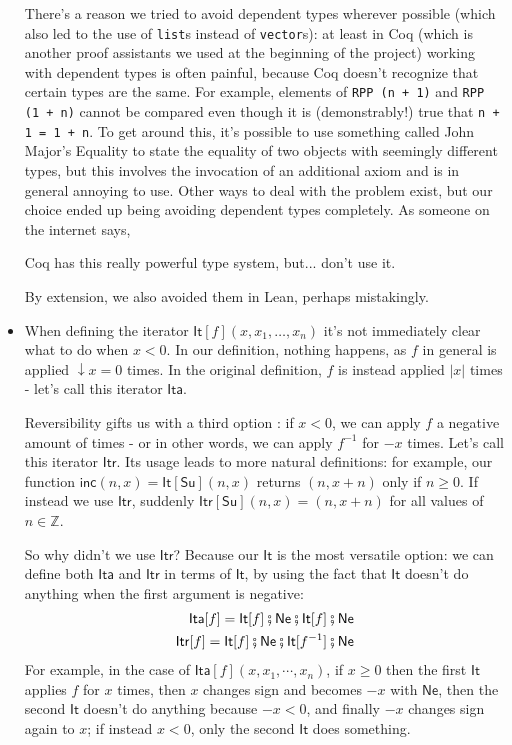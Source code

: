 \documentclass{book}
\theoremstyle{definition}
\theoremstyle{remark}
\theoremstyle{plain}
\newcommand{\ZZ}{\mathbb{Z}}
\newcommand{\rppNe}{\mathsf{Ne}}
\newcommand{\rppSu}{\mathsf{Su}}
\newcommand{\rppCo}{\fatsemi}
\newcommand{\rppIt}{\mathsf{It}}
\newcommand{\rppIta}{\mathsf{Ita}}
\newcommand{\rppItr}{\mathsf{Itr}}
\newcommand{\rppinc}{\mathsf{inc}}
\begin{document}
\begin{itemize}
There's a reason we tried to avoid dependent types wherever possible
(which also led to the use of \lstinline{list}s instead of \lstinline{vector}s):
at least in Coq (which is another proof assistants we used at the beginning of the project)
working with dependent types is often painful, because Coq doesn't recognize that certain types are the same.
For example, elements of \lstinline{RPP (n + 1)} and \lstinline{RPP (1 + n)} cannot be compared even though it is (demonstrably!) true that
\lstinline{n + 1 = 1 + n}. To get around this, it's possible to use something called John Major's Equality \cite{cpdtbook}
to state the equality of two objects with seemingly different types,
but this involves the invocation of an additional axiom and is in general annoying to use.
Other ways to deal with the problem exist,
but our choice ended up being avoiding dependent types completely.
As someone on the internet says,
\begin{displayquote}
Coq has this really powerful type system, but... don't use it. \cite{dougdad}
\end{displayquote}
By extension, we also avoided them in Lean, perhaps mistakingly.
\item When defining the iterator $\rppIt[f] (x, x_1, \dots, x_n)$ it's not immediately clear what to do when $x < 0$.
In our definition, nothing happens, as $f$ in general is applied $\downarrow x = 0$ times.
In the original definition, $f$ is instead applied $| x |$ times - let's call this iterator $\rppIta$.

Reversibility gifts us with a third option \cite{matos03tcs}: if $x < 0$,
we can apply $f$ a negative amount of times - or in other words, we can apply $f^{-1}$ for $- x$ times.
Let's call this iterator $\rppItr$.
Its usage leads to more natural definitions:
for example, our function $\rppinc (n, x) = \rppIt[\rppSu] (n, x)$ returns $(n, x+n)$ only if $n \ge 0$.
If instead we use $\rppItr$, suddenly $\rppItr[\rppSu] (n, x) = (n, x + n)$ for all values of $n \in \ZZ$.

So why didn't we use $\rppItr$?
Because our $\rppIt$ is the most versatile option:
we can define both $\rppIta$ and $\rppItr$ in terms of $\rppIt$,
by using the fact that $\rppIt$ doesn't do anything when the first argument is negative:
\begin{align*}
  \rppIta[f] = \rppIt[f] \rppCo \rppNe \rppCo \rppIt[f] \rppCo \rppNe \\
  \rppItr[f] = \rppIt[f] \rppCo \rppNe \rppCo \rppIt[f^{-1}] \rppCo \rppNe
\end{align*}
For example, in the case of $\rppIta[f](x,x_1,\cdots,x_n)$, if $x \ge 0$ then the first $\rppIt$ applies $f$ for $x$ times,
then $x$ changes sign and becomes $-x$ with $\rppNe$, then the second $\rppIt$ doesn't do anything because $- x < 0$,
and finally $-x$ changes sign again to $x$; if instead $x < 0$, only the second $\rppIt$ does something.


\end{itemize}
\end{document}
